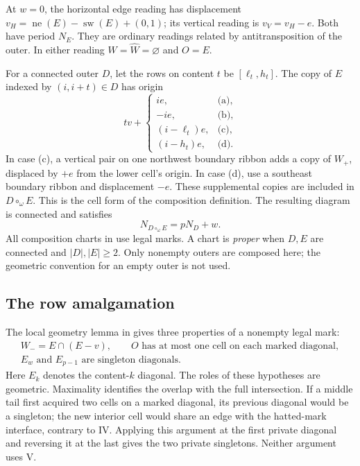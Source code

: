 \documentclass[11pt,a4paper]{amsart}
\numberwithin{equation}{section}
\theoremstyle{plain}
\theoremstyle{definition}
\begin{document}
At \(w=0\), the horizontal edge reading has displacement
\(v_H=\operatorname{ne}(E)-\operatorname{sw}(E)+(0,1)\); its vertical reading is \(v_V=v_H-e\).  Both have period \(N_E\).  They are ordinary readings related by antitransposition of the outer.  In either reading \(W=\widehat W=\varnothing\) and \(O=E\).

For a connected outer \(D\), let the rows on content \(t\) be \([\ell_t,h_t]\).  The copy of \(E\) indexed by \((i,i+t)\in D\) has origin
\begin{equation}\label{eq:placements}
 tv+\begin{cases}
 ie,&\text{(a)},\\
 -ie,&\text{(b)},\\
 (i-\ell_t)e,&\text{(c)},\\
 (i-h_t)e,&\text{(d)}.
 \end{cases}
\end{equation}
In case (c), a vertical pair on one northwest boundary ribbon adds a copy of \(W_+\), displaced by \(+e\) from the lower cell's origin.  In case (d), use a southeast boundary ribbon and displacement \(-e\).  These supplemental copies are included in \(D\circ_\omega E\).  This is the cell form of the composition definition.  The resulting diagram is connected and satisfies
\begin{equation}\label{eq:composition-span}
 N_{D\circ_\omega E}=pN_D+w.
\end{equation}
All composition charts in  use legal marks.  A chart is \emph{proper} when \(D,E\) are connected and \(|D|,|E|\ge2\).  Only nonempty outers are composed here; the geometric convention for an empty outer is not used.

\subsection{The row amalgamation}

The local geometry lemma in \cite{Shields2026Gluing} gives three properties of a nonempty legal mark:
\begin{equation}\label{eq:local-properties}
 \begin{gathered}
 W_-=E\cap(E-v),\qquad
 O\text{ has at most one cell on each marked diagonal},\\
 E_w\text{ and }E_{p-1}\text{ are singleton diagonals}.
 \end{gathered}
\end{equation}
Here \(E_k\) denotes the content-\(k\) diagonal.  The roles of these hypotheses are geometric.  Maximality identifies the overlap with the full intersection.  If a middle tail first acquired two cells on a marked diagonal, its previous diagonal would be a singleton; the new interior cell would share an edge with the hatted-mark interface, contrary to IV.  Applying this argument at the first private diagonal and reversing it at the last gives the two private singletons.  Neither argument uses V.
\end{document}

